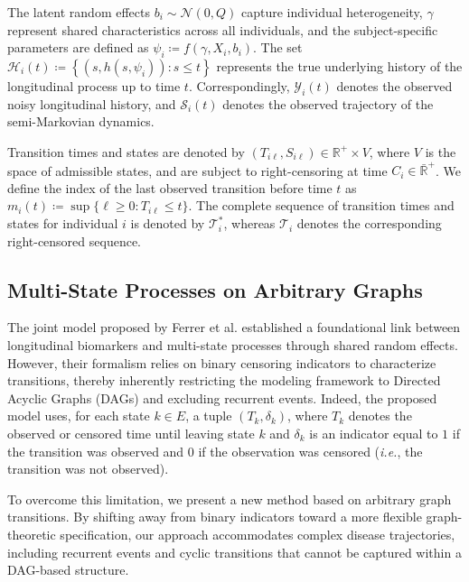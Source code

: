 \documentclass{sn-jnl}
\begin{document}
The latent random effects $b_i \sim \mathcal{N}(0, Q)$ capture individual heterogeneity, $\gamma$ represent shared characteristics across all individuals, and the subject-specific parameters are defined as $\psi_i \coloneqq f(\gamma, X_i, b_i)$. The set $\mathcal{H}_i(t) \coloneqq \left\{ (s, h(s, \psi_i)) : s \leq t \right\}$ represents the true underlying history of the longitudinal process up to time $t$. Correspondingly, $\mathcal{Y}_i(t)$ denotes the observed noisy longitudinal history, and $\mathcal{S}_i(t)$ denotes the observed trajectory of the semi-Markovian dynamics.  

Transition times and states are denoted by $(T_{i\ell}, S_{i\ell}) \in \mathbb{R}^+ \times V$, where $V$ is the space of admissible states, and are subject to right-censoring at time $C_i \in \bar{\mathbb{R}}^+$. We define the index of the last observed transition before time $t$ as $m_i(t) \coloneqq \sup \{ \ell \geq 0 : T_{i\ell} \leq t \}$. The complete sequence of transition times and states for individual $i$ is denoted by $\mathcal{T}_i^*$, whereas $\mathcal{T}_i$ denotes the corresponding right-censored sequence.

\subsection{Multi-State Processes on Arbitrary Graphs} \label{sec:model}

The joint model proposed by Ferrer et al. \citep{ferrer2016joint} established a foundational link between longitudinal biomarkers and multi-state processes through shared random effects. However, their formalism relies on binary censoring indicators to characterize transitions, thereby inherently restricting the modeling framework to Directed Acyclic Graphs (DAGs) and excluding recurrent events. Indeed, the proposed model uses, for each state $k \in E$, a tuple $(T_k, \delta_k)$, where $T_k$ denotes the observed or censored time until leaving state $k$ and $\delta_k$ is an indicator equal to $1$ if the transition was observed and $0$ if the observation was censored (\textit{i.e.}, the transition was not observed).

To overcome this limitation, we present a new method based on arbitrary graph transitions. By shifting away from binary indicators toward a more flexible graph-theoretic specification, our approach accommodates complex disease trajectories, including recurrent events and cyclic transitions that cannot be captured within a DAG-based structure.
\end{document}
